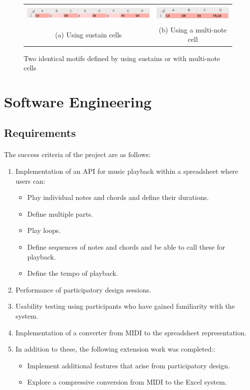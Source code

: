 \begin{figure}[ht]
\begin{tabular}{cc}
  \includegraphics[height=8mm]{figs/withoutMulti.png} &
  \includegraphics[height=8mm]{figs/withMulti.png} \\
  (a) Using sustain cells&(b) Using a multi-note cell\\
\end{tabular}
\caption{Two identical motifs defined by using sustains or with multi-note cells}
\label{intro:sustainMulti}
\end{figure}

\section{Software Engineering}

\subsection{Requirements}

\paragraph{} The success criteria of the project are as follows:

\begin{enumerate}
  \item Implementation of an API for music playback within a spreadsheet where users can:
  \begin{itemize}
     \item Play individual notes and chords and define their durations.
     \item Define multiple parts.
     \item Play loops.
     \item Define sequences of notes and chords and be able to call these for playback.
     \item Define the tempo of playback.
   \end{itemize}
  \item Performance of participatory design sessions.
  \item Usability testing using participants who have gained familiarity with the system.
  \item Implementation of a converter from MIDI to the spreadsheet representation.
  \item In addition to these, the following extension work was completed::
  \begin{itemize}
     \item Implement additional features that arise from participatory design.
     \item Explore a compressive conversion from MIDI to the Excel system.
   \end{itemize}
\end{enumerate}

